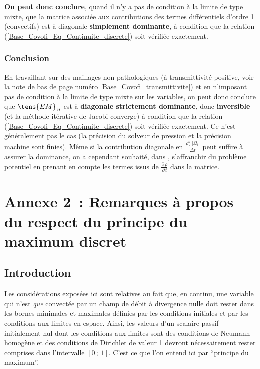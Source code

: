 {\bf On peut donc conclure}, quand il n'y a pas de condition à la limite de type mixte,
que la matrice associée aux contributions
 des termes
différentiels d'ordre 1 (convectifs) est à diagonale {\bf simplement
dominante}, à condition que la relation (\ref{Base_Covofi_Eq_Continuite_discrete}) soit
vérifiée exactement.


\subsubsection*{Conclusion}
En travaillant sur
des maillages non pathologiques (à transmittivité positive, voir la note de
bas de page numéro \ref{Base_Covofi_transmittivite}) et en n'imposant pas de condition à la limite
de type mixte sur les variables, on peut donc conclure que
$\tens{EM}_{\,n}$
est à {\bf diagonale strictement dominante}, donc {\bf inversible} (et la
méthode itérative de Jacobi converge) à condition que la relation
(\ref{Base_Covofi_Eq_Continuite_discrete}) soit
vérifiée exactement. Ce n'est généralement pas le cas (la précision du
solveur de pression et la précision machine sont finies). Même si
la contribution diagonale en
$\displaystyle \frac {\rho_I^n\ |\Omega_i|}{\Delta t}$ peut suffire à
assurer la dominance, on a cependant souhaité, dans \CS, s'affranchir du
problème potentiel en prenant en compte les termes issus de $\displaystyle \frac
{{\partial}\,\rho}{{\partial}\,t}$ dans la matrice.

\newpage
\section*{Annexe 2~: Remarques à propos du respect du principe du maximum discret}
\subsection*{Introduction}
%
Les considérations exposées ici sont relatives au fait que, en continu,
une variable qui n'est {\em que} convectée par un champ de débit à
divergence nulle doit rester dans les bornes minimales et maximales définies
par les conditions initiales et par les conditions aux limites en espace. Ainsi,
les valeurs d'un scalaire passif initialement nul
dont les conditions aux limites sont des conditions de Neumann homogène
et des conditions de Dirichlet de valeur 1 devront nécessairement rester
comprises dans l'intervalle $[0\,;\,1]$. C'est ce que l'on entend ici par
``principe du maximum''.

